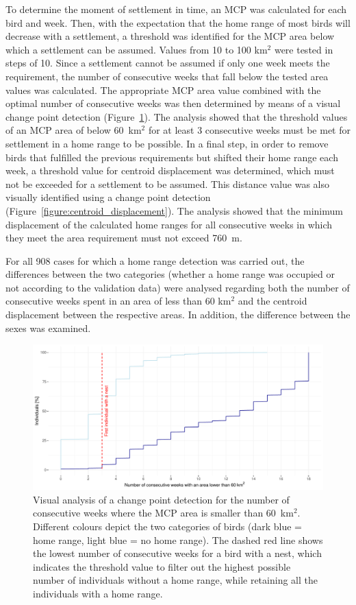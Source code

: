 To determine the moment of settlement in time, an MCP was calculated for each bird and week. Then, with the expectation that the home range of most birds will decrease with a settlement, a threshold was identified for the MCP area below which a settlement can be assumed. Values from 10 to 100 km$^2$ were tested in steps of 10. Since a settlement cannot be assumed if only one week meets the requirement, the number of consecutive weeks that fall below the tested area values was calculated. The appropriate MCP area value combined with the optimal number of consecutive weeks was then determined by means of a visual change point detection (Figure~\ref{figure:hr_area_weeks}). The analysis showed that the threshold values of an MCP area of below 60~km$^2$ for at least 3 consecutive weeks must be met for settlement in a home range to be possible. In a final step, in order to remove birds that fulfilled the previous requirements but shifted their home range each week, a threshold value for centroid displacement was determined, which must not be exceeded for a settlement to be assumed. This distance value was also visually identified using a change point detection (Figure~\ref{figure:centroid_displacement}). The analysis showed that the minimum displacement of the calculated home ranges for all consecutive weeks in which they meet the area requirement must not exceed 760~m.

For all 908 cases for which a home range detection was carried out, the differences between the two categories (whether a home range was occupied or not according to the validation data) were analysed regarding both the number of consecutive weeks spent in an area of less than 60 km$^2$ and the centroid displacement between the respective areas. In addition, the difference between the sexes was examined.

\begin{figure}[H]
\centering
\includegraphics[width=1\textwidth]{figures/methods/01_size_60consecutive.pdf}
\caption[Change point detection for the number of weeks with an MCP < 60~km$^2$]{Visual analysis of a change point detection for the number of consecutive weeks where the MCP area is smaller than 60~km$^2$. Different colours depict the two categories of birds (dark blue = home range, light blue = no home range). The dashed red line shows the lowest number of consecutive weeks for a bird with a nest, which indicates the threshold value to filter out the highest possible number of individuals without a home range, while retaining all the individuals with a home range.}
\label{figure:hr_area_weeks}
\end{figure}

